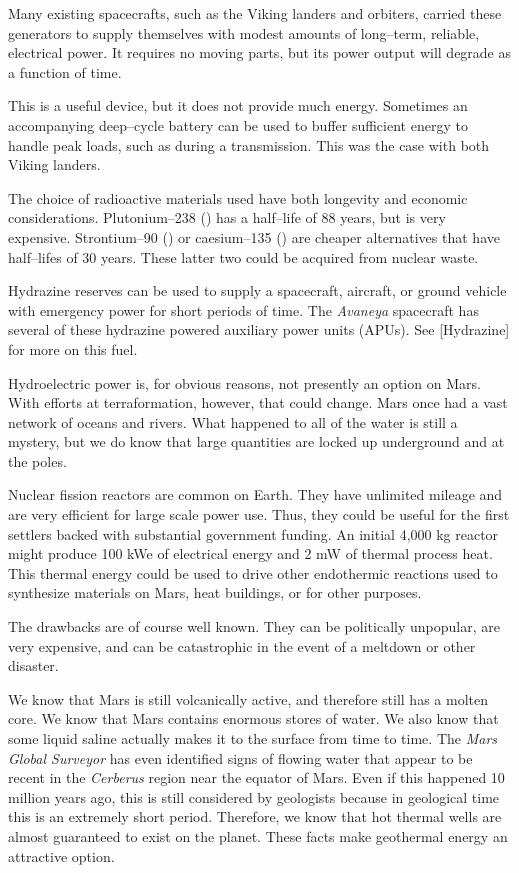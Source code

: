 Many existing spacecrafts, such as the Viking landers and orbiters, carried these generators to supply themselves with modest amounts of long--term, reliable, electrical power. It requires no moving parts, but its power output will degrade as a function of time.

This is a useful device, but it does not provide much energy. Sometimes an accompanying deep--cycle battery can be used to buffer sufficient energy to handle peak loads, such as during a transmission. This was the case with both Viking landers.

The choice of radioactive materials used have both longevity and economic considerations. Plutonium--238 () has a half--life of 88 years, but is very expensive. Strontium--90 () or caesium--135 () are cheaper alternatives that have half--lifes of 30 years. These latter two could be acquired from nuclear waste.

Hydrazine reserves can be used to supply a spacecraft, aircraft, or ground vehicle with emergency power for short periods of time. The {\it Avaneya} spacecraft has several of these hydrazine powered auxiliary power units (APUs). See [Hydrazine] for more on this fuel.

Hydroelectric power is, for obvious reasons, not presently an option on Mars. With efforts at terraformation, however, that could change. Mars once had a vast network of oceans and rivers. What happened to all of the water is still a mystery, but we do know that large quantities are locked up underground and at the poles.

Nuclear fission reactors are common on Earth. They have unlimited mileage and are very efficient for large scale power use. Thus, they could be useful for the first settlers backed with substantial government funding. An initial 4,000 kg reactor might produce 100 kWe of electrical energy and 2 mW of thermal process heat. This thermal energy could be used to drive other endothermic reactions used to synthesize materials on Mars, heat buildings, or for other purposes.

The drawbacks are of course well known. They can be politically unpopular, are very expensive, and can be catastrophic in the event of a meltdown or other disaster.

We know that Mars is still volcanically active, and therefore still has a molten core. We know that Mars contains enormous stores of water. We also know that some liquid saline actually makes it to the surface from time to time. The {\it Mars Global Surveyor} has even identified signs of flowing water that appear to be recent in the {\it Cerberus} region near the equator of Mars. Even if this happened 10 million years ago, this is still considered  by geologists because in geological time this is an extremely short period. Therefore, we know that hot thermal wells are almost guaranteed to exist on the planet. These facts make geothermal energy an attractive option.

